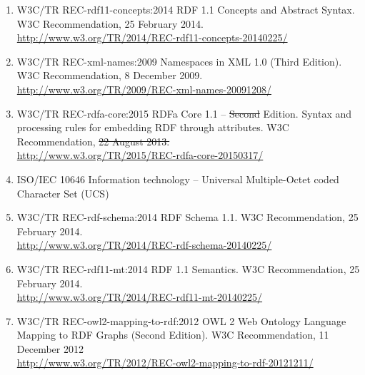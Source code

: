 \documentclass[10pt,fleqn,final]{scrreprt}
\providecommand{\DIFadd}[1]{{\protect\color{blue}\uwave{#1}}} %
\providecommand{\DIFdel}[1]{{\protect\color{red}\sout{#1}}}                      %
\providecommand{\DIFaddbegin}{} %
\providecommand{\DIFaddend}{} %
\providecommand{\DIFdelbegin}{} %
\providecommand{\DIFdelend}{} %
\begin{document}
\begin{enumerate}[label=\bfseries NR\arabic*]
  \DIFaddend \item{W3C/TR REC-rdf11-concepts:2014} {RDF 1.1 Concepts and Abstract Syntax.  W3C Recommendation, 25 February 2014. \\ \url{http://www.w3.org/TR/2014/REC-rdf11-concepts-20140225/}}\DIFaddbegin \label{nref-RDF}
  \DIFaddend \item{W3C/TR REC-xml-names:2009} {Namespaces in XML 1.0 (Third Edition). W3C Recommendation, 8 December 2009.\\
   \url{http://www.w3.org/TR/2009/REC-xml-names-20091208/}}\DIFdelbegin %
\DIFdelend \DIFaddbegin \label{nref-XMLns}
  \item{W3C/TR REC-rdfa-core:2015} \DIFaddend {RDFa Core 1.1 -- \DIFdelbegin \DIFdel{Second }\DIFdelend \DIFaddbegin \DIFadd{Third }\DIFaddend Edition.  Syntax and processing rules for embedding RDF through attributes. W3C Recommendation, \DIFdelbegin \DIFdel{22 August 2013.}\DIFdelend \DIFaddbegin \DIFadd{17 March 2015.}\DIFaddend \\ \DIFdelbegin %
\DIFdelend \DIFaddbegin \url{http://www.w3.org/TR/2015/REC-rdfa-core-20150317/}\DIFaddend }\DIFaddbegin \label{nref-RDFa}
  \DIFaddend %
  \item{ISO/IEC 10646} {Information technology – Universal Multiple-Octet coded Character Set (UCS)}\DIFaddbegin \label{nref-UCS}
  \DIFaddend %
  \item{W3C/TR REC-rdf-schema:2014} {RDF Schema 1.1. W3C Recommendation, 25 February 2014.\\ \url{http://www.w3.org/TR/2014/REC-rdf-schema-20140225/}}\DIFaddbegin \label{nref-RDFS}
  \DIFaddend \item{W3C/TR REC-rdf11-mt:2014} {RDF 1.1 Semantics.  W3C Recommendation, 25 February 2014. \\ \url{http://www.w3.org/TR/2014/REC-rdf11-mt-20140225/}}\DIFaddbegin \label{nref-RDFSs}
  \DIFaddend \item{W3C/TR REC-owl2-mapping-to-rdf:2012} {OWL 2 Web Ontology Language
Mapping to RDF Graphs (Second Edition).  W3C Recommendation, 11 December 2012\\ \url{http://www.w3.org/TR/2012/REC-owl2-mapping-to-rdf-20121211/}}\DIFaddbegin \label{nref-OWL2RDF}

\end{enumerate}
\end{document}
